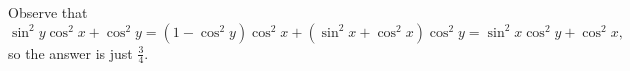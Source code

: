 Observe that \[\sin^2y\cos^2x+\cos^2y=\left(1-\cos^2y\right)\cos^2x+\left(\sin^2x+\cos^2x\right)\cos^2y=\sin^2x\cos^2y+\cos^2x,\] so the answer is just $\boxed{\frac{3}{4}}$.